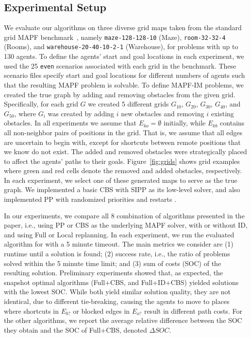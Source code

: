 \documentclass[letterpaper]{article} %
\def\
UrlFont{\rm}  %
\newcommand{\eko}{E_{ko}} %
\newcommand{\ekb}{E_{kb}} %
\newcommand{\eao}{E_{o?}} %
\newcommand{\eab}{E_{b?}} %
\theoremstyle{definition}
\begin{document}
\subsection{Experimental Setup}
We evaluate our algorithms on three diverse grid maps taken from the standard grid MAPF benchmark~\cite{stern2019multi}, namely \texttt{maze-128-128-10} (Maze),
\texttt{room-32-32-4} (Rooms), and
\texttt{warehouse-20-40-10-2-1} (Warehouse),
for problems with up to 130 agents.
To define the agents' start and goal locations in each experiment, we used the 25 \texttt{even} scenarios associated with each grid in the benchmark. These scenario files specify start and goal locations for different numbers of agents such that the resulting MAPF problem is solvable.
To define MAPF-IM problems, we created the true graph by adding and removing obstacles from the given grid.
Specifically, for each grid $G$ we created 5 different grids $G_{10}$,
$G_{20}$, $G_{30}$, $G_{40}$, and $G_{50}$, where $G_i$ was created by adding $i$ new obstacles and removing $i$ existing obstacles. In all experiments we assume that $\eko=\emptyset$ initially, while $\ekb$ contains all non-neighbor pairs of positions in the grid. That is, we assume that all edges are uncertain to begin with, except for shortcuts between remote positions that we know do not exist.
The added and removed obstacles were strategically placed to affect the agents' paths to their goals. Figure~\ref{fig:grids} shows grid examples where green and red cells denote the removed and added obstacles, respectively.
In each experiment, we select one of these generated maps to serve as the true graph. We implemented a basic CBS  \cite{sharon2015conflict} with SIPP \cite{phillips2011sipp} as its low-level solver, and also implemented PP with randomized priorities and restarts \cite{bennewitz2001optimizing}.

In our experiments, we compare all 8 combination of algorithms presented in the paper, i.e., using PP or CBS as the underlying MAPF solver,
with or without ID, and using Full or Local replanning.
In each experiment, we run the evaluated algorithm for with a 5 minute timeout.
The main metrics we consider are (1) runtime until a solution is found;
(2) success rate, i.e., the ratio of problems solved within the 5 minute time limit; and (3) sum of costs (SOC) of the resulting solution.
Preliminary experiments showed that, as expected, the snapshot optimal algorithms (Full+CBS, and Full+ID+CBS) yielded solutions with the lowest SOC. While both yield similar solution quality, they are not identical, due to different tie-breaking, causing the agents to move to places where shortcuts in $\eab$ or blocked edges in $\eao$ result in different path costs.
For the other algorithms, we report the average relative difference between the SOC they obtain and the SOC of Full+CBS, denoted $\Delta SOC$.
\end{document}
